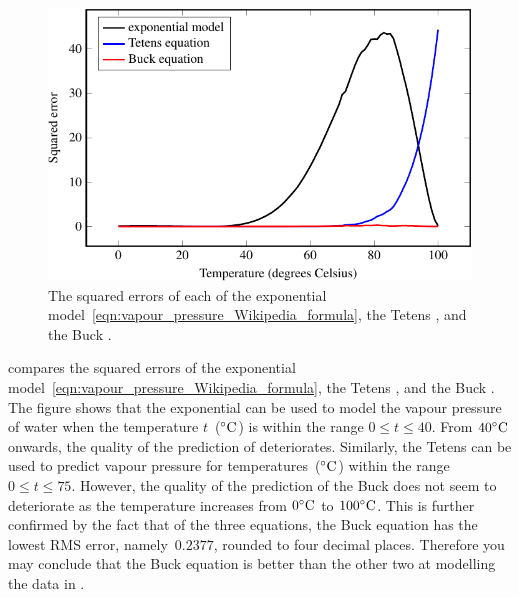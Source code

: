 \documentclass[a4paper,oneside,12pt]{article}
\begin{document}
\begin{problem}
{\begin{solution}
\begin{figure}[!htbp]
\centering
\includegraphics[scale=1.1]{image/11/vapour-pressure-squared-errors.pdf}
\caption{%
  The squared errors of each of the exponential
  model~\eqref{eqn:vapour_pressure_Wikipedia_formula}, the Tetens
  , and the Buck
  .
}
\label{fig:vapour_pressure_squared_errors}
\end{figure}

 compares the squared
errors of the exponential
model~\eqref{eqn:vapour_pressure_Wikipedia_formula}, the Tetens
, and the Buck
.  The figure shows that the
exponential  can be
used to model the vapour pressure of water when the
temperature $t$~(${}^{\circ}\textrm{C}$) is within the range
$0 \leq t \leq 40$.  From ${40}^{\circ}\textrm{C}$ onwards, the quality of the
prediction of 
deteriorates.  Similarly, the Tetens
 can be used to predict vapour
pressure for temperatures~(${}^{\circ}\textrm{C}$) within the range
$0 \leq t \leq 75$.  However, the quality of the prediction of the
Buck  does not seem to deteriorate
as the temperature increases from ${0}^{\circ}\textrm{C}$ to ${100}^{\circ}\textrm{C}$.
This is further confirmed by the fact that of the three equations, the
Buck equation has the lowest RMS error, namely~$0.2377$, rounded to
four decimal places.  Therefore you may conclude that the Buck
equation is better than the other two at modelling the data in
.
\end{solution}
}{}


\end{problem}
\end{document}
